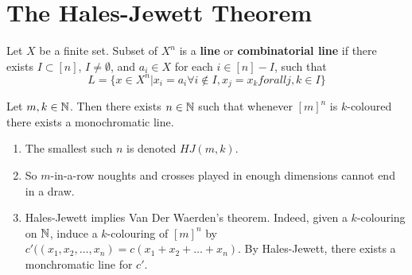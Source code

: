 \chapter{The Hales-Jewett Theorem}
\label{cha:hales-jewett-theorem}

Let $X$ be a finite set.  Subset of $X^{n}$ is a \textbf{line} or
\textbf{combinatorial line} if there exists $I \subset [n]$, $I \neq
\emptyset$, and $a_{i} \in X$ for each $i \in [n] - I$, such that
\begin{equation}
  \label{eq:3}
  L = \{ x \in X^{n} | x_{i} = a_{i} \forall i \notin I, x_{j} = x_{k}
  forall j, k \in I \}
\end{equation}

\begin{thm}
  \label{defn:hales_jewett_theorem:1}
  Let $m, k \in \mathbb{N}$.  Then there exists $n \in \mathbb{N}$ such that whenever
  $[m]^{n}$ is $k$-coloured there exists a monochromatic line.
\end{thm}

\begin{remark}
  \begin{enumerate}
  \item The smallest such $n$ is denoted $HJ(m, k)$.
  \item So $m$-in-a-row noughts and crosses played in enough
    dimensions cannot end in a draw.
  \item Hales-Jewett implies Van Der Waerden's theorem.
    Indeed, given a $k$-colouring on $\mathbb{N}$, induce a $k$-colouring of
    $[m]^{n}$ by $c'((x_{1}, x_{2}, \dots, x_{n}) = c(x_{1} + x_{2} +
    \dots + x_{n})$. By Hales-Jewett, there exists a monchromatic line
    for $c'$.
  \end{enumerate}
\end{remark}




